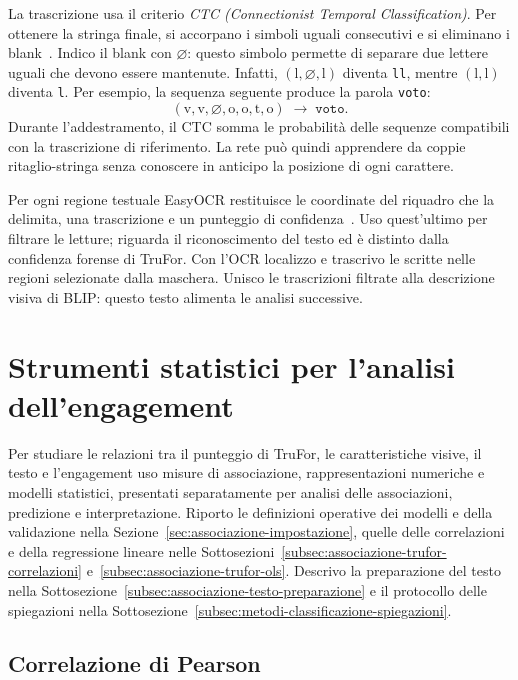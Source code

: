 La trascrizione usa il criterio \emph{CTC (Connectionist Temporal Classification)}. Per ottenere la stringa finale, si accorpano i simboli uguali consecutivi e si eliminano i blank~\cite{10.1145/1143844.1143891}. Indico il blank con $\varnothing$: questo simbolo permette di separare due lettere uguali che devono essere mantenute. Infatti, $(\mathrm{l},\varnothing,\mathrm{l})$ diventa \texttt{ll}, mentre $(\mathrm{l},\mathrm{l})$ diventa \texttt{l}. Per esempio, la sequenza seguente produce la parola \texttt{voto}:
\[
    (\mathrm{v},\mathrm{v},\varnothing,\mathrm{o},\mathrm{o},\mathrm{t},\mathrm{o})
    \;\longrightarrow\;
    \texttt{voto}.
\]
Durante l'addestramento, il CTC somma le probabilità delle sequenze compatibili con la trascrizione di riferimento. La rete può quindi apprendere da coppie ritaglio-stringa senza conoscere in anticipo la posizione di ogni carattere.

Per ogni regione testuale EasyOCR restituisce le coordinate del riquadro che la delimita, una trascrizione e un punteggio di confidenza~\cite{easyocr_software}. Uso quest'ultimo per filtrare le letture; riguarda il riconoscimento del testo ed è distinto dalla confidenza forense di TruFor. Con l'OCR localizzo e trascrivo le scritte nelle regioni selezionate dalla maschera. Unisco le trascrizioni filtrate alla descrizione visiva di BLIP: questo testo alimenta le analisi successive.

\section{Strumenti statistici per l'analisi dell'engagement}
\label{sec:background-analisi-engagement}

Per studiare le relazioni tra il punteggio di TruFor, le caratteristiche visive, il testo e l'engagement uso misure di associazione, rappresentazioni numeriche e modelli statistici, presentati separatamente per analisi delle associazioni, predizione e interpretazione. Riporto le definizioni operative dei modelli e della validazione nella Sezione~\ref{sec:associazione-impostazione}, quelle delle correlazioni e della regressione lineare nelle Sottosezioni~\ref{subsec:associazione-trufor-correlazioni} e~\ref{subsec:associazione-trufor-ols}. Descrivo la preparazione del testo nella Sottosezione~\ref{subsec:associazione-testo-preparazione} e il protocollo delle spiegazioni nella Sottosezione~\ref{subsec:metodi-classificazione-spiegazioni}.

\subsection{Correlazione di Pearson}
\label{subsec:background-pearson}

